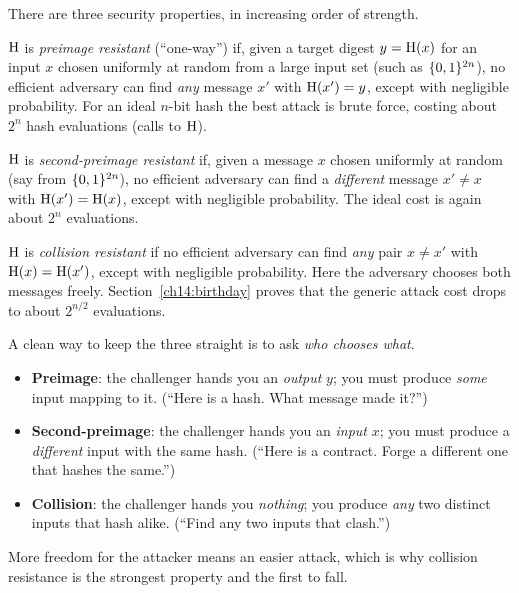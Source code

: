 There are three security properties, in increasing order of strength.

\begin{definition}
\label{ch14:def-preimage}
$\operatorname{H}$ is \emph{preimage resistant} (``one-way'') if, given a target digest $y = \operatorname{H}(x)$ for an input $x$ chosen uniformly at random from a large input set (such as $\{0,1\}^{2n}$), no efficient adversary can find \emph{any} message $x'$ with $\operatorname{H}(x') = y$, except with negligible probability. For an ideal $n$-bit hash the best attack is brute force, costing about $2^{n}$ hash evaluations (calls to $\operatorname{H}$).
\end{definition}

\begin{definition}
\label{ch14:def-second}
$\operatorname{H}$ is \emph{second-preimage resistant} if, given a message $x$ chosen uniformly at random (say from $\{0,1\}^{2n}$), no efficient adversary can find a \emph{different} message $x' \ne x$ with $\operatorname{H}(x') = \operatorname{H}(x)$, except with negligible probability. The ideal cost is again about $2^{n}$ evaluations.
\end{definition}

\begin{definition}
\label{ch14:def-collision}
$\operatorname{H}$ is \emph{collision resistant} if no efficient adversary can find \emph{any} pair $x \ne x'$ with $\operatorname{H}(x) = \operatorname{H}(x')$, except with negligible probability. Here the adversary chooses both messages freely. Section~\ref{ch14:birthday} proves that the generic attack cost drops to about $2^{n/2}$ evaluations.
\end{definition}

\begin{intuitionbox}
A clean way to keep the three straight is to ask \emph{who chooses what}.
\begin{itemize}
  \item \textbf{Preimage}: the challenger hands you an \emph{output} $y$; you must produce \emph{some} input mapping to it. (``Here is a hash. What message made it?'')
  \item \textbf{Second-preimage}: the challenger hands you an \emph{input} $x$; you must produce a \emph{different} input with the same hash. (``Here is a contract. Forge a different one that hashes the same.'')
  \item \textbf{Collision}: the challenger hands you \emph{nothing}; you produce \emph{any} two distinct inputs that hash alike. (``Find any two inputs that clash.'')
\end{itemize}
More freedom for the attacker means an easier attack, which is why collision resistance is the strongest property and the first to fall.
\end{intuitionbox}

